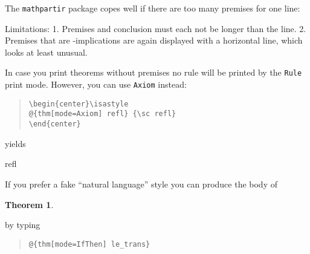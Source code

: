\begin{isabellebody}
\begin{isamarkuptext}
The \texttt{mathpartir} package copes well if there are too many
premises for one line:
\begin{center}
\end{center}

Limitations: 1. Premises and conclusion must each not be longer than
the line.  2. Premises that are \isa{{\isasymLongrightarrow}}-implications are again
displayed with a horizontal line, which looks at least unusual.


In case you print theorems without premises no rule will be printed by the
\texttt{Rule} print mode. However, you can use \texttt{Axiom} instead:
\begin{quote}
\verb!\begin{center}\isastyle!\\
\verb!@!\verb!{thm[mode=Axiom] refl} {\sc refl}! \\
\verb!\end{center}!
\end{quote}
yields
\begin{center}\isastyle
{} {\sc refl} 
\end{center}%
\end{isamarkuptext}%
\isamarkuptrue%
%
\isamarkuptrue%
%
\begin{isamarkuptext}%
If you prefer a fake ``natural language'' style you can produce
the body of
\newtheorem{theorem}{Theorem}
\begin{theorem}
\end{theorem}
by typing
\begin{quote}
\verb!@!\verb!{thm[mode=IfThen] le_trans}!
\end{quote}


\end{isamarkuptext}
\end{isabellebody}
